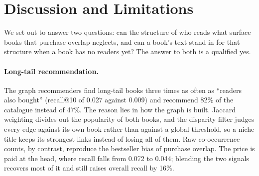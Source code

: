 
\section{Discussion and Limitations}
\label{sec:discussion}

We set out to answer two questions: can the structure of who reads what surface
books that purchase overlap neglects, and can a book's text stand in for that
structure when a book has no readers yet? The answer to both is a qualified yes.

\paragraph{Long-tail recommendation.}
The graph recommenders find long-tail books three times as often as
``readers also bought'' (recall@10 of 0.027 against 0.009) and recommend 82\% of
the catalogue instead of 47\%. The reason lies in how the graph is built.
Jaccard weighting divides out the popularity of both books, and the disparity
filter judges every edge against its own book rather than against a global
threshold, so a niche title keeps its strongest links instead of losing all of
them. Raw co-occurrence counts, by contrast, reproduce the bestseller bias of
purchase overlap. The price is paid at the head, where recall falls from 0.072
to 0.044; blending the two signals recovers most of it and still raises overall
recall by 16\%.

